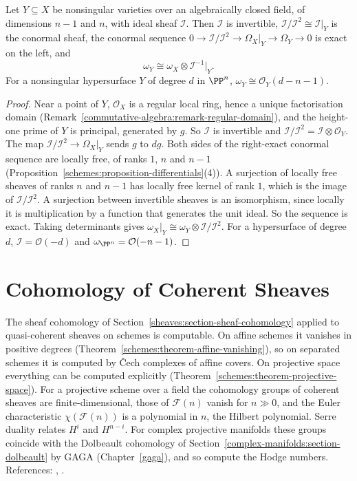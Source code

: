 \begin{proposition}[Adjunction]\label{schemes:proposition-adjunction}
Let $Y \subseteq X$ be nonsingular varieties over an algebraically closed field, of dimensions $n - 1$ and $n$, with ideal sheaf $\mathcal{I}$. Then
$\mathcal{I}$ is invertible, $\mathcal{I}/\mathcal{I}^2 \cong \mathcal{I}|_Y$ is the conormal sheaf, the conormal sequence
$0 \to \mathcal{I}/\mathcal{I}^2 \to \Omega_X|_Y \to \Omega_Y \to 0$ is exact on the left, and
\[
\omega_Y \cong \omega_X \otimes \mathcal{I}^{-1}|_Y .
\]
For a nonsingular hypersurface $Y$ of degree $d$ in $\PP^n$, $\omega_Y \cong \mathcal{O}_Y(d - n - 1)$.
\end{proposition}

\begin{proof}
Near a point of $Y$, $\mathcal{O}_X$ is a regular local ring, hence a unique factorisation domain (Remark~\ref{commutative-algebra:remark-regular-domain}),
and the height-one prime of $Y$ is principal, generated by $g$. So $\mathcal{I}$ is invertible and $\mathcal{I}/\mathcal{I}^2 = \mathcal{I} \otimes \mathcal{O}_Y$. The map
$\mathcal{I}/\mathcal{I}^2 \to \Omega_X|_Y$ sends $g$ to $dg$. Both sides of the right-exact conormal sequence are locally free, of ranks $1$, $n$ and $n - 1$
(Proposition~\ref{schemes:proposition-differentials}(4)). A surjection of locally free sheaves of ranks $n$ and $n - 1$ has locally free
kernel of rank $1$, which is the image of $\mathcal{I}/\mathcal{I}^2$. A surjection between invertible sheaves is an isomorphism, since locally it is
multiplication by a function that generates the unit ideal. So the sequence is exact. Taking
determinants gives $\omega_X|_Y \cong \omega_Y \otimes \mathcal{I}/\mathcal{I}^2$. For a hypersurface of degree $d$, $\mathcal{I} = \mathcal{O}(-d)$ and $\omega_{\PP^n} = \mathcal{O}(-n-1)$.
\end{proof}

\section{Cohomology of Coherent Sheaves}\label{schemes:section-coherent-cohomology}
The sheaf cohomology of Section~\ref{sheaves:section-sheaf-cohomology} applied to quasi-coherent sheaves on schemes is computable. On affine schemes it
vanishes in positive degrees (Theorem~\ref{schemes:theorem-affine-vanishing}), so on separated schemes it is computed by \v{C}ech
complexes of affine covers. On projective space everything can be computed explicitly
(Theorem~\ref{schemes:theorem-projective-space}). For a projective scheme over a field the cohomology groups of coherent sheaves are
finite-dimensional, those of $\mathcal{F}(n)$ vanish for $n \gg 0$, and the Euler characteristic $\chi(\mathcal{F}(n))$ is a polynomial in $n$, the
Hilbert polynomial. Serre duality relates $H^i$ and $H^{n-i}$. For complex projective manifolds these groups coincide with the Dolbeault
cohomology of Section~\ref{complex-manifolds:section-dolbeault} by GAGA (Chapter~\ref{gaga}), and so compute the Hodge numbers. References:
\cite[Chapter III]{hartshorne-ag}, \cite{stacks-project}.

